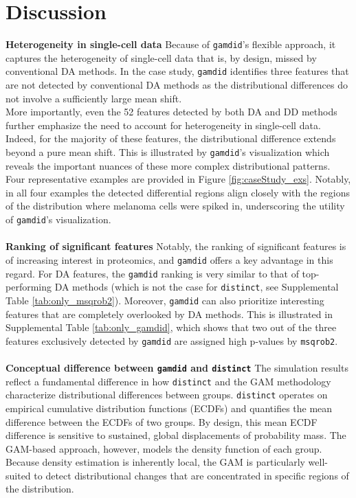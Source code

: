 \section{Discussion} \label{discussion}

\textbf{Heterogeneity in single-cell data}
Because of \texttt{gamdid}'s flexible approach, it captures the heterogeneity of single-cell data that is, by design, missed by conventional DA methods. In the case study, \texttt{gamdid} identifies three features that are not detected by conventional DA methods as the distributional differences do not involve a sufficiently large mean shift.\\
More importantly, even the 52 features detected by both DA and DD methods further emphasize the need to account for heterogeneity in single-cell data. Indeed, for the majority of these features, the distributional difference extends beyond a pure mean shift. This is illustrated by \texttt{gamdid}'s visualization which reveals the important nuances of these more complex distributional patterns.\\
Four representative examples are provided in Figure \ref{fig:caseStudy_exs}. Notably, in all four examples the detected differential regions align closely with the regions of the distribution where melanoma cells were spiked in, underscoring the utility of \texttt{gamdid}'s visualization.
\\
\\
\textbf{Ranking of significant features}
Notably, the ranking of significant features is of increasing interest in proteomics, and \texttt{gamdid} offers a key advantage in this regard. For DA features, the \texttt{gamdid} ranking is very similar to that of top-performing DA methods (which is not the case for \texttt{distinct}, see Supplemental Table \ref{tab:only_msqrob2}). Moreover, \texttt{gamdid} can also prioritize interesting features that are completely overlooked by DA methods. This is illustrated in Supplemental Table \ref{tab:only_gamdid}, which shows that two out of the three features exclusively detected by \texttt{gamdid} are assigned high p-values by \texttt{msqrob2}.
\\
\\
\textbf{Conceptual difference between \texttt{gamdid} and \texttt{distinct}}
The simulation results reflect a fundamental difference in how \texttt{distinct} and the GAM methodology characterize distributional differences between groups. \texttt{distinct} operates on empirical cumulative distribution functions (ECDFs) and quantifies the mean difference between the ECDFs of two groups. By design, this mean ECDF difference is sensitive to sustained, global displacements of probability mass. The GAM-based approach, however, models the density function of each group. Because density estimation is inherently local, the GAM is particularly well-suited to detect distributional changes that are concentrated in specific regions of the distribution.\\
